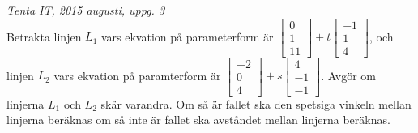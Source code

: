 {\it Tenta IT, 2015 augusti, uppg. 3}\\
Betrakta linjen $L_1$ vars ekvation på parameterform är $\begin{bmatrix}0\\1\\11\end{bmatrix}+t\begin{bmatrix}-1\\1\\4\end{bmatrix}$, och linjen $L_2$ vars ekvation på paramterform är $\begin{bmatrix}-2\\0\\4\end{bmatrix}+s\begin{bmatrix}4\\-1\\-1\end{bmatrix}$. Avgör om linjerna $L_1$ och $L_2$ skär varandra. Om så är fallet ska den spetsiga vinkeln mellan linjerna beräknas om så inte är fallet ska avståndet mellan linjerna beräknas.